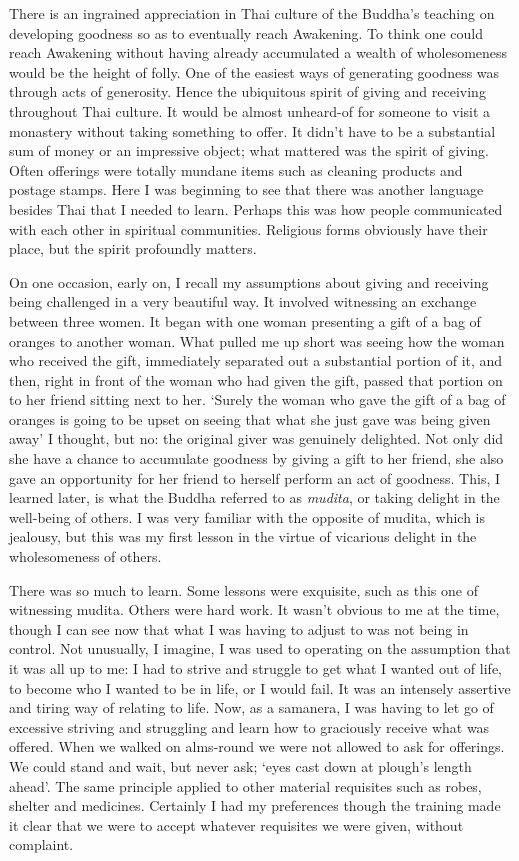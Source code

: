 There is an ingrained appreciation in Thai culture of the Buddha's
teaching on developing goodness so as to eventually reach Awakening. To
think one could reach Awakening without having already accumulated a
wealth of wholesomeness would be the height of folly. One of the easiest
ways of generating goodness was through acts of generosity. Hence the
ubiquitous spirit of giving and receiving throughout Thai culture. It
would be almost unheard-of for someone to visit a monastery without
taking something to offer. It didn't have to be a substantial sum of
money or an impressive object; what mattered was the spirit of giving.
Often offerings were totally mundane items such as cleaning products and
postage stamps. Here I was beginning to see that there was another
language besides Thai that I needed to learn. Perhaps this was how
people communicated with each other in spiritual communities. Religious
forms obviously have their place, but the spirit profoundly matters.

On one occasion, early on, I recall my assumptions about giving and
receiving being challenged in a very beautiful way. It involved
witnessing an exchange between three women. It began with one woman
presenting a gift of a bag of oranges to another woman. What pulled me
up short was seeing how the woman who received the gift, immediately
separated out a substantial portion of it, and then, right in front of
the woman who had given the gift, passed that portion on to her friend
sitting next to her. `Surely the woman who gave the gift of a bag of
oranges is going to be upset on seeing that what she just gave was being
given away' I thought, but no: the original giver was genuinely
delighted. Not only did she have a chance to accumulate goodness by
giving a gift to her friend, she also gave an opportunity for her friend
to herself perform an act of goodness. This, I learned later, is what
the Buddha referred to as \emph{mudita}, or taking delight in the
well-being of others. I was very familiar with the opposite of mudita,
which is jealousy, but this was my first lesson in the virtue of
vicarious delight in the wholesomeness of others.

There was so much to learn. Some lessons were exquisite, such as this
one of witnessing mudita. Others were hard work. It wasn't obvious to me
at the time, though I can see now that what I was having to adjust to
was not being in control. Not unusually, I imagine, I was used to
operating on the assumption that it was all up to me: I had to strive
and struggle to get what I wanted out of life, to become who I wanted to
be in life, or I would fail. It was an intensely assertive and tiring
way of relating to life. Now, as a samanera, I was having to let go of
excessive striving and struggling and learn how to graciously receive
what was offered. When we walked on alms-round we were not allowed to
ask for offerings. We could stand and wait, but never ask; `eyes cast
down at plough's length ahead'. The same principle applied to other
material requisites such as robes, shelter and medicines. Certainly I
had my preferences though the training made it clear that we were to
accept whatever requisites we were given, without complaint.

